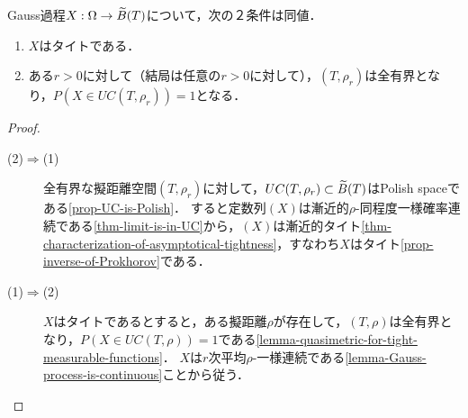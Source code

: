 \documentclass[uplatex,dvipdfmx]{jsreport}
\begin{document}
\begin{theorem}\label{thm-tightness-for-Gaussian-process}
    Gauss過程$X:\Omega\to\widetilde{B}(T)$について，次の２条件は同値．
    \begin{enumerate}
        \item $X$はタイトである．
        \item ある$r>0$に対して（結局は任意の$r>0$に対して），$(T,\rho_r)$は全有界となり，$P(X\in UC(T,\rho_r))=1$となる．
    \end{enumerate}
\end{theorem}
\begin{proof}\mbox{}
    \begin{description}
        \item[(2)$\Rightarrow$(1)] 全有界な擬距離空間$(T,\rho_r)$に対して，$UC(T,\rho_r)\subset\widetilde{B}(T)$はPolish spaceである\ref{prop-UC-is-Polish}．
        すると定数列$(X)$は漸近的$\rho$-同程度一様確率連続である\ref{thm-limit-is-in-UC}から，$(X)$は漸近的タイト\ref{thm-characterization-of-asymptotical-tightness}，すなわち$X$はタイト\ref{prop-inverse-of-Prokhorov}である．
        \item[(1)$\Rightarrow$(2)]
        $X$はタイトであるとすると，ある擬距離$\rho$が存在して，$(T,\rho)$は全有界となり，$P(X\in UC(T,\rho))=1$である\ref{lemma-quasimetric-for-tight-measurable-functions}．
        $X$は$r$次平均$\rho$-一様連続である\ref{lemma-Gauss-process-is-continuous}ことから従う．
    \end{description}
\end{proof}
\end{document}
